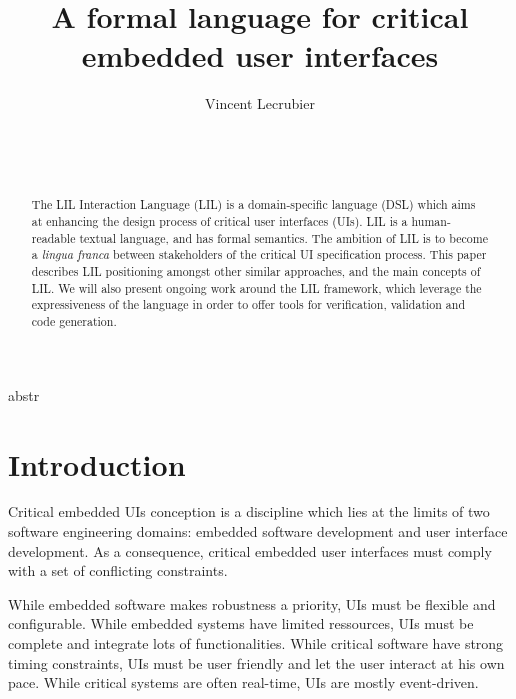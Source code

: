 \documentclass{sigchi}
\begin{document}
\title{A formal language for critical embedded user interfaces} 

\author{
  \alignauthor Vincent Lecrubier\\
    \\
    \\
    \\
 }


\maketitle

\begin{abstract}
The LIL Interaction Language (LIL) is a domain-specific language (DSL) which aims at enhancing the design process of critical user interfaces (UIs). LIL is a human-readable textual language, and has formal semantics. The ambition of LIL is to become a \textit{lingua franca} between stakeholders of the critical UI specification process. This paper describes LIL positioning amongst other similar approaches, and the main concepts of LIL. We will also present ongoing work around the LIL framework, which leverage the expressiveness of the language in order to offer tools for verification, validation and code generation.
\end{abstract}


abstr%
\section{Introduction}
Critical  embedded  UIs conception  is  a discipline  which  lies at  the  limits  of  two software  engineering domains:   embedded   software    development   and   user   interface development. As a consequence,  critical embedded user interfaces must comply with  a set  of conflicting constraints.

While  embedded software  makes robustness  a priority,  UIs  must be flexible  and  configurable.   While  embedded  systems  have  limited ressources,   UIs   must   be   complete   and   integrate   lots   of functionalities.   While   critical   software  have   strong   timing constraints, UIs  must be user friendly  and let the  user interact at his  own pace.  While critical  systems are  often real-time, UIs are mostly event-driven.
\end{document}

